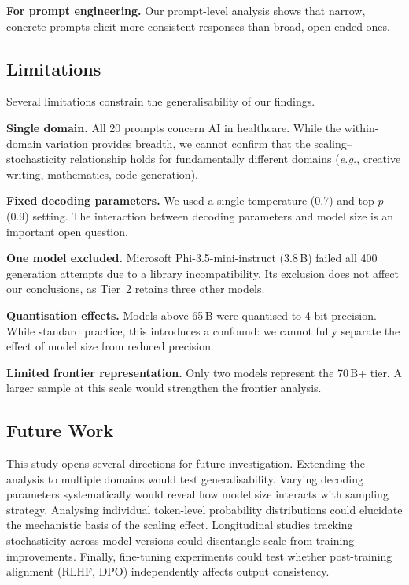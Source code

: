 \documentclass[11pt,a4paper]{article}
\newcommand{\eg}{\textit{e.g.}}
\begin{document}
\textbf{For prompt engineering.}
Our prompt-level analysis shows that narrow, concrete prompts elicit more consistent responses than broad, open-ended ones.

\subsection{Limitations}

Several limitations constrain the generalisability of our findings.

\textbf{Single domain.}
All 20 prompts concern AI in healthcare.
While the within-domain variation provides breadth, we cannot confirm that the scaling--stochasticity relationship holds for fundamentally different domains (\eg, creative writing, mathematics, code generation).

\textbf{Fixed decoding parameters.}
We used a single temperature (0.7) and top-$p$ (0.9) setting.
The interaction between decoding parameters and model size is an important open question.

\textbf{One model excluded.}
Microsoft Phi-3.5-mini-instruct (3.8\,B) failed all 400 generation attempts due to a library incompatibility.
Its exclusion does not affect our conclusions, as Tier~2 retains three other models.

\textbf{Quantisation effects.}
Models above 65\,B were quantised to 4-bit precision.
While standard practice, this introduces a confound: we cannot fully separate the effect of model size from reduced precision.

\textbf{Limited frontier representation.}
Only two models represent the 70\,B+ tier.
A larger sample at this scale would strengthen the frontier analysis.

\subsection{Future Work}

This study opens several directions for future investigation.
Extending the analysis to multiple domains would test generalisability.
Varying decoding parameters systematically would reveal how model size interacts with sampling strategy.
Analysing individual token-level probability distributions could elucidate the mechanistic basis of the scaling effect.
Longitudinal studies tracking stochasticity across model versions could disentangle scale from training improvements.
Finally, fine-tuning experiments could test whether post-training alignment (RLHF, DPO) independently affects output consistency.
\end{document}
